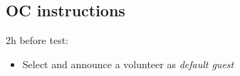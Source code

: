 \subsection{OC instructions}

2h before test:
\begin{itemize}
	\item Select and announce a volunteer as \emph{default guest}
\end{itemize}

% 
